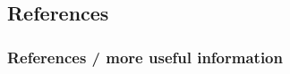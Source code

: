 \documentclass{beamer}
\begin{document}
\begin{frame}
  \section{References}
  \frametitle{References / more useful information}
  \pause
  \begin{tabular}{ | l | p{5cm} |}
  \end{tabular}
\end{frame}
\end{document}
